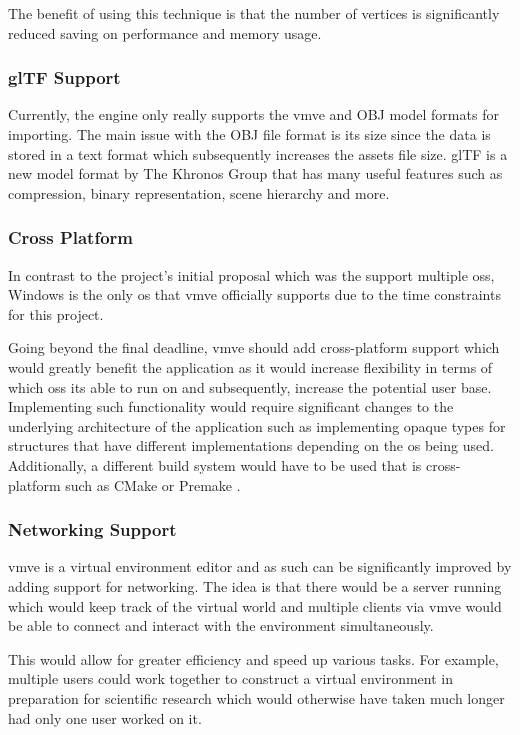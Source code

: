 \documentclass[11pt]{article}
\begin{document}
The benefit of using this technique is that the number of vertices is
significantly reduced saving on performance and memory usage.


\subsubsection*{glTF Support}
Currently, the engine only really supports the \gls*{vmve} and OBJ model formats for
importing. The main issue with the OBJ file format is its size since the data is
stored in a text format which subsequently increases the assets file size. glTF
\cite{gltf} is a new model format by The Khronos Group that has many useful
features such as compression, binary representation, scene hierarchy and more.

\subsubsection*{Cross Platform}
In contrast to the project's initial proposal which was the support multiple
\glspl*{os}, Windows is the only \gls*{os} that \gls*{vmve} officially supports due
to the time constraints for this project. 

Going beyond the final deadline, \gls*{vmve} should add cross-platform support
which would greatly benefit the application as it would increase flexibility in
terms of which \glspl*{os} its able to run on and subsequently, increase the
potential user base. Implementing such functionality would require significant
changes to the underlying architecture of the application such as implementing
opaque types for structures that have different implementations depending on the
\gls*{os} being used. Additionally, a different build system would have to be
used that is cross-platform such as CMake \cite{cmake} or Premake \cite{premake}.

\subsubsection*{Networking Support}
\gls*{vmve} is a virtual environment editor and as such can be significantly
improved by adding support for networking. The idea is that there would be a
server running which would keep track of the virtual world and multiple clients
via \gls*{vmve} would be able to connect and interact with the environment
simultaneously.

This would allow for greater efficiency and speed up various tasks. For example,
multiple users could work together to construct a virtual environment in
preparation for scientific research which would otherwise have taken much longer
had only one user worked on it.
\end{document}
